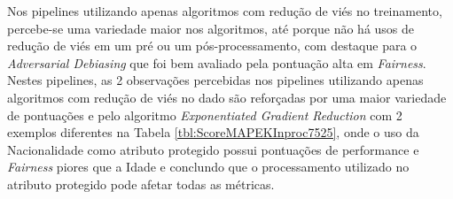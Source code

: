 \documentclass[portugues]{ic-tese}
\begin{document}
Nos pipelines utilizando apenas algoritmos com redução de viés no treinamento, percebe-se uma variedade maior nos algoritmos, até porque não há usos de redução de viés em um pré ou um pós-processamento, com destaque para o \textit{Adversarial Debiasing} que foi bem avaliado pela pontuação alta em \textit{Fairness}. Nestes pipelines, as 2 observações percebidas nos pipelines utilizando apenas algoritmos com redução de viés no dado são reforçadas por uma maior variedade de pontuações e pelo algoritmo \textit{Exponentiated Gradient Reduction} com 2 exemplos diferentes na Tabela \ref{tbl:ScoreMAPEKInproc7525}, onde o uso da Nacionalidade como atributo protegido possui pontuações de performance e \textit{Fairness} piores que a Idade e conclundo que o processamento utilizado no atributo protegido pode afetar todas as métricas.

\begin{table}[H]
\begin{center}
  \caption{Melhores opções escolhidas pelo modelo MAPE-K \\ Apenas com redução de viés no resultado - 50\% Performance/50\% Fairness}
\label{tbl:ScoreMAPEKPostproc5050}
\end{center}
\end{table}
\end{document}
